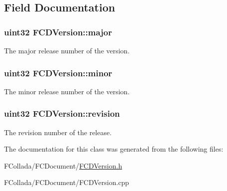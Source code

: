 \subsection{Field Documentation}
\hypertarget{classFCDVersion_ad2508c7e5740ba8f03a0afe18bb9c7b5}{
\subsubsection[{major}]{\setlength{\rightskip}{0pt plus 5cm}uint32 {\bf FCDVersion::major}}}
\label{classFCDVersion_ad2508c7e5740ba8f03a0afe18bb9c7b5}
The major release number of the version. \hypertarget{classFCDVersion_a7fa0db1f60be770ccff8ff93c3e11deb}{
\subsubsection[{minor}]{\setlength{\rightskip}{0pt plus 5cm}uint32 {\bf FCDVersion::minor}}}
\label{classFCDVersion_a7fa0db1f60be770ccff8ff93c3e11deb}
The minor release number of the version. \hypertarget{classFCDVersion_a24a8596d2fa8ebfbb5866abb7be4801c}{
\subsubsection[{revision}]{\setlength{\rightskip}{0pt plus 5cm}uint32 {\bf FCDVersion::revision}}}
\label{classFCDVersion_a24a8596d2fa8ebfbb5866abb7be4801c}
The revision number of the release. 

The documentation for this class was generated from the following files:\begin{DoxyCompactItemize}
\item 
FCollada/FCDocument/\hyperlink{FCDVersion_8h}{FCDVersion.h}\item 
FCollada/FCDocument/FCDVersion.cpp\end{DoxyCompactItemize}
